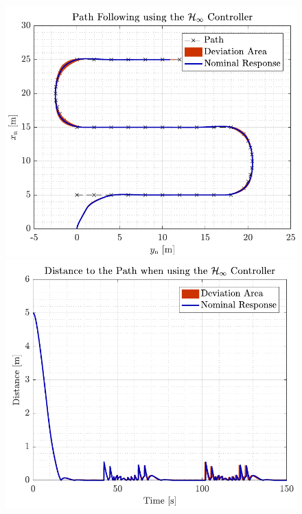 \begin{figure}[H]
    \captionbox 
    {   
        \label{fig:path_rob}
    }                                                                 
    {                                                                  
        \includegraphics[width=.45\textwidth]{figures/path_rob}         
    }                                                                    
    \hspace{5pt}                                                          
    \captionbox  
    {      
        \label{fig:dist_rob}
    }                                                                          
    {
        \includegraphics[width=.45\textwidth]{figures/dist_rob}
    }
\end{figure}

